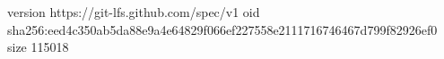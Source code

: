 version https://git-lfs.github.com/spec/v1
oid sha256:eed4c350ab5da88e9a4e64829f066ef227558e2111716746467d799f82926ef0
size 115018
